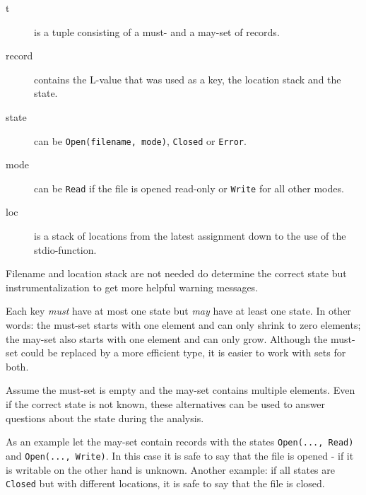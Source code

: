 
\begin{description}
\item[t] is a tuple consisting of a must- and a may-set of records.

\item[record] contains the L-value that was used as a key, the location stack and the state.

\item[state] can be \verb|Open(filename, mode)|, \verb|Closed| or \verb|Error|.

\item[mode] can be \verb|Read| if the file is opened read-only or \verb|Write| for all other modes.

\item[loc] is a stack of locations from the latest assignment down to the use of the stdio-function.
\end{description}
Filename and location stack are not needed do determine the correct state but instrumentalization to get more helpful warning messages.

Each key \textit{must} have at most one state but \textit{may} have at least one state.
In other words: the must-set starts with one element and can only shrink to zero elements; the may-set also starts with one element and can only grow.
Although the must-set could be replaced by a more efficient type, it is easier to work with sets for both.

Assume the must-set is empty and the may-set contains multiple elements. Even if the correct state is not known, these alternatives can be used to answer questions about the state during the analysis.

As an example let the may-set contain records with the states \verb|Open(..., Read)| and \verb|Open(..., Write)|. In this case it is safe to say that the file is opened - if it is writable on the other hand is unknown. Another example: if all states are \verb|Closed| but with different locations, it is safe to say that the file is closed. %

